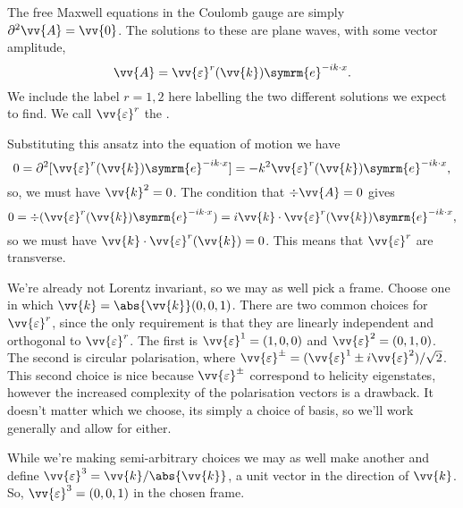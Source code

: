 \documentclass[fleqn]{NotesClass}
\newcommand{\dalembertian}{\partial^2}
\newcommand{\e}{\symrm{e}}
\begin{document}
    The free Maxwell equations in the Coulomb gauge are simply \(\dalembertian\vv{A} = \vv{0}\).
    The solutions to these are plane waves, with some vector amplitude,
    \begin{equation}
        \vv{A} = \vv{\varepsilon}^r(\vv{k}) \e^{-ik\cdot x}.
    \end{equation}
    We include the label \(r = 1, 2\) here labelling the two different solutions we expect to find.
    We call \(\vv{\varepsilon}^r\) the .
    
    Substituting this ansatz into the equation of motion we have
    \begin{equation}
        0 = \dalembertian[\vv{\varepsilon}^r(\vv{k}) \e^{-ik\cdot x}] = -k^2 \vv{\varepsilon}^r(\vv{k}) \e^{-ik\cdot x},
    \end{equation}
    so, we must have \(\vv{k}^2 = 0\).
    The condition that \(\div\vv{A} = 0\) gives
    \begin{equation}
        0 = \div(\vv{\varepsilon}^r(\vv{k})\e^{-ik \cdot x}) = i\vv{k} \cdot \vv{\varepsilon}^r(\vv{k}) \e^{-ik\cdot x},
    \end{equation}
    so we must have \(\vv{k} \cdot \vv{\varepsilon}^r(\vv{k}) = 0\).
    This means that \(\vv{\varepsilon}^r\) are transverse.
    
    We're already not Lorentz invariant, so we may as well pick a frame.
    Choose one in which \(\vv{k} = \abs{\vv{k}}(0, 0, 1)\).
    There are two common choices for \(\vv{\varepsilon}^r\), since the only requirement is that they are linearly independent and orthogonal to \(\vv{\varepsilon}^r\).
    The first is \(\vv{\varepsilon}^1 = (1, 0, 0)\) and \(\vv{\varepsilon}^2 = (0, 1, 0)\).
    The second is circular polarisation, where \(\vv{\varepsilon}^{\pm} = (\vv{\varepsilon}^1 \pm i\vv{\varepsilon}^2)/\sqrt{2}\).
    This second choice is nice because \(\vv{\varepsilon}^{\pm}\) correspond to helicity eigenstates, however the increased complexity of the polarisation vectors is a drawback.
    It doesn't matter which we choose, its simply a choice of basis, so we'll work generally and allow for either.
    
    While we're making semi-arbitrary choices we may as well make another and define \(\vv{\varepsilon}^3 = \vv{k}/\abs{\vv{k}}\), a unit vector in the direction of \(\vv{k}\).
    So, \(\vv{\varepsilon}^3 = (0, 0, 1)\) in the chosen frame.
    
\end{document}
